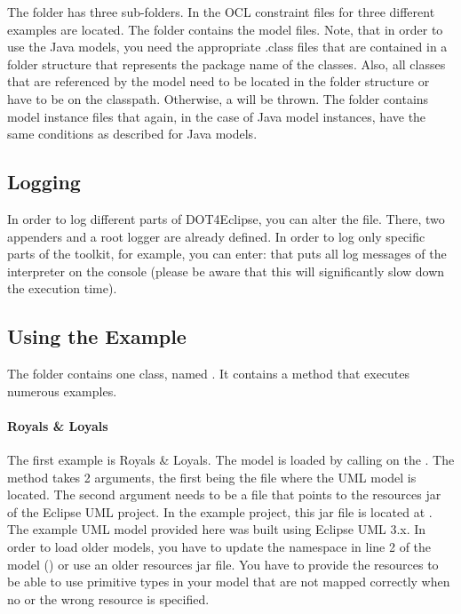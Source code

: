 The  folder has three sub-folders. In  the OCL constraint files for three different examples are located. The  folder contains the model files. Note, that in order to use the Java models, you need the appropriate .class files that are contained in a folder structure that represents the package name of the classes. Also, all classes that are referenced by the model need to be located in the folder structure or have to be on the classpath. Otherwise, a  will be thrown. The  folder contains model instance files that again, in the case of Java model instances, have the same conditions as described for Java models.

\subsection{Logging}

In order to log different parts of \acl{DOT4Eclipse}, you can alter the  file. There, two appenders and a root logger are already defined. In order to log only specific parts of the toolkit, for example, you can enter:  that puts all log messages of the interpreter on the console (please be aware that this will significantly slow down the execution time).

\subsection{Using the Example}

The  folder contains one class, named . It contains a  method that executes numerous examples. 

\paragraph{Royals \& Loyals}
The first example is Royals \& Loyals. The model is loaded by calling  on the . The method takes 2 arguments, the first being the file where the UML model is located. The second argument needs to be a file that points to the resources jar of the Eclipse UML project. In the example project, this jar file is located at . The example UML model provided here was built using Eclipse UML 3.x. In order to load older models, you have to update the namespace in line 2 of the model () or use an older resources jar file. You have to provide the resources to be able to use primitive types in your model that are not mapped correctly when no or the wrong resource is specified.

